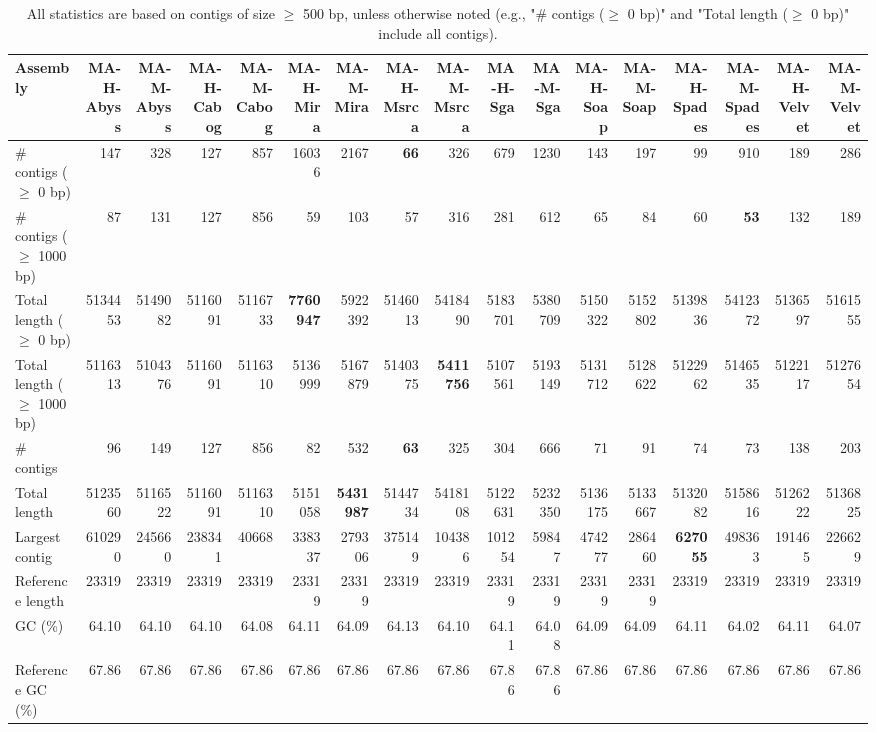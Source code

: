 \documentclass[12pt,a4paper]{article}
\begin{document}
\begin{table}[ht]
\begin{center}
\caption{All statistics are based on contigs of size $\geq$ 500 bp, unless otherwise noted (e.g., "\# contigs ($\geq$ 0 bp)" and "Total length ($\geq$ 0 bp)" include all contigs).}
\begin{tabular}{|l*{16}{|r}|}
\hline
Assembly & MA-H-Abyss & MA-M-Abyss & MA-H-Cabog & MA-M-Cabog & MA-H-Mira & MA-M-Mira & MA-H-Msrca & MA-M-Msrca & MA-H-Sga & MA-M-Sga & MA-H-Soap & MA-M-Soap & MA-H-Spades & MA-M-Spades & MA-H-Velvet & MA-M-Velvet \\ \hline
\# contigs ($\geq$ 0 bp) & 147 & 328 & 127 & 857 & 16036 & 2167 & {\bf 66} & 326 & 679 & 1230 & 143 & 197 & 99 & 910 & 189 & 286 \\ \hline
\# contigs ($\geq$ 1000 bp) & 87 & 131 & 127 & 856 & 59 & 103 & 57 & 316 & 281 & 612 & 65 & 84 & 60 & {\bf 53} & 132 & 189 \\ \hline
Total length ($\geq$ 0 bp) & 5134453 & 5149082 & 5116091 & 5116733 & {\bf 7760947} & 5922392 & 5146013 & 5418490 & 5183701 & 5380709 & 5150322 & 5152802 & 5139836 & 5412372 & 5136597 & 5161555 \\ \hline
Total length ($\geq$ 1000 bp) & 5116313 & 5104376 & 5116091 & 5116310 & 5136999 & 5167879 & 5140375 & {\bf 5411756} & 5107561 & 5193149 & 5131712 & 5128622 & 5122962 & 5146535 & 5122117 & 5127654 \\ \hline
\# contigs & 96 & 149 & 127 & 856 & 82 & 532 & {\bf 63} & 325 & 304 & 666 & 71 & 91 & 74 & 73 & 138 & 203 \\ \hline
Total length & 5123560 & 5116522 & 5116091 & 5116310 & 5151058 & {\bf 5431987} & 5144734 & 5418108 & 5122631 & 5232350 & 5136175 & 5133667 & 5132082 & 5158616 & 5126222 & 5136825 \\ \hline
Largest contig & 610290 & 245660 & 238341 & 40668 & 338337 & 279306 & 375149 & 104386 & 101254 & 59847 & 474277 & 286460 & {\bf 627055} & 498363 & 191465 & 226629 \\ \hline
Reference length & 23319 & 23319 & 23319 & 23319 & 23319 & 23319 & 23319 & 23319 & 23319 & 23319 & 23319 & 23319 & 23319 & 23319 & 23319 & 23319 \\ \hline
GC (\%) & 64.10 & 64.10 & 64.10 & 64.08 & 64.11 & 64.09 & 64.13 & 64.10 & 64.11 & 64.08 & 64.09 & 64.09 & 64.11 & 64.02 & 64.11 & 64.07 \\ \hline
Reference GC (\%) & 67.86 & 67.86 & 67.86 & 67.86 & 67.86 & 67.86 & 67.86 & 67.86 & 67.86 & 67.86 & 67.86 & 67.86 & 67.86 & 67.86 & 67.86 & 67.86 \\ \hline

\end{tabular}
\end{center}
\end{table}
\end{document}
